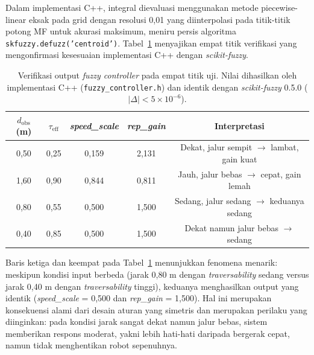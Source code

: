 Dalam implementasi C++, integral dievaluasi menggunakan metode piecewise-linear eksak pada grid dengan resolusi 0,01 yang diinterpolasi pada titik-titik potong MF untuk akurasi maksimum, meniru persis algoritma \texttt{skfuzzy.defuzz('centroid')}. Tabel~\ref{tab:fuzzy_verify} menyajikan empat titik verifikasi yang mengonfirmasi kesesuaian implementasi C++ dengan \textit{scikit-fuzzy}.

\begin{table}[H]
\centering
\caption{Verifikasi output \textit{fuzzy controller} pada empat titik uji. Nilai dihasilkan oleh implementasi C++ (\texttt{fuzzy\_controller.h}) dan identik dengan \textit{scikit-fuzzy} 0.5.0 ($|\Delta| < 5 \times 10^{-6}$).}
\label{tab:fuzzy_verify}
\begin{tabular}{ccccc}
\toprule
\textbf{$d_\text{obs}$ (m)} & \textbf{$\tau_\text{eff}$} &
\textbf{\textit{speed\_scale}} & \textbf{\textit{rep\_gain}} &
\textbf{Interpretasi} \\
\midrule
0,50 & 0,25 & 0,159 & 2,131 & Dekat, jalur sempit $\rightarrow$ lambat, gain kuat \\
1,60 & 0,90 & 0,844 & 0,811 & Jauh, jalur bebas $\rightarrow$ cepat, gain lemah  \\
0,80 & 0,55 & 0,500 & 1,500 & Sedang, jalur sedang $\rightarrow$ keduanya sedang \\
0,40 & 0,85 & 0,500 & 1,500 & Dekat namun jalur bebas $\rightarrow$ sedang        \\
\bottomrule
\end{tabular}
\end{table}

Baris ketiga dan keempat pada Tabel~\ref{tab:fuzzy_verify} menunjukkan fenomena menarik: meskipun kondisi input berbeda (jarak 0,80 m dengan \textit{traversability} sedang versus jarak 0,40 m dengan \textit{traversability} tinggi), keduanya menghasilkan output yang identik (\textit{speed\_scale} = 0,500 dan \textit{rep\_gain} = 1,500). Hal ini merupakan konsekuensi alami dari desain aturan yang simetris dan merupakan perilaku yang diinginkan: pada kondisi jarak sangat dekat namun jalur bebas, sistem memberikan respons moderat, yakni lebih hati-hati daripada bergerak cepat, namun tidak menghentikan robot sepenuhnya.